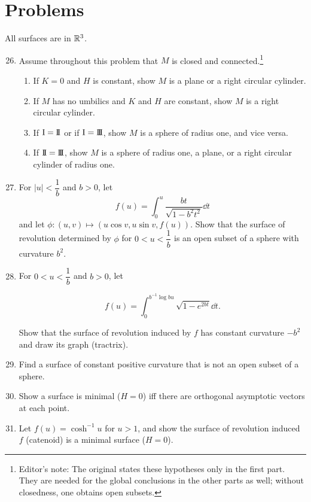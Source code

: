 \documentclass[../main]{subfiles}
\begin{document}
\section*{Problems}
All surfaces are in $\mathbb{R}^3$.
\begin{enumerate}
    \setcounter{enumi}{25}
    \item\label{pro:26} Assume throughout this problem that $M$ is closed and connected.\footnote{Editor's note: The original states these hypotheses only in the first part. They are needed for the global conclusions in the other parts as well; without closedness, one obtains open subsets.}
    \begin{enumerate}[label = (\roman*)]
        \item If $K = 0$ and $H$ is constant, show $M$ is a plane or a right circular cylinder.
        \item If $M$ has no umbilics and $K$ and $H$ are constant, show $M$ is a right circular cylinder.
        \item If $\mathrm{I} = \mathrm{I\!I}$ or if $\mathrm{I} = \mathrm{I\!I\!I}$, show $M$ is a sphere of radius one, and vice versa.
        \item If $\mathrm{I\!I} = \mathrm{I\!I\!I}$, show $M$ is a sphere of radius one, a plane, or a right circular cylinder of radius one.
    \end{enumerate}
      
    
    \item\label{pro:27} For $|u| < \dfrac{1}{b}$ and $b > 0$, let
    \[f(u) = \int_0^u \frac {b t} {\sqrt{1 - b^2 t^2}} \dd t\] 
    and let $\phi : (u, v) \mapsto (u \cos v, u \sin v, f(u))$. Show that the surface of revolution determined by $\phi$ for $0 < u < \dfrac{1}{b}$ is an open subset of a sphere with curvature $b^2$.
    
    \item\label{pro:28} For $0 < u < \dfrac{1}{b}$ and $b > 0$, let 
    
    \[f(u) = \int_0^{b^{-1} \log b u} \sqrt {1 - e^{2 bt}} \dd t.\]
    
    Show that the surface of revolution induced by $f$ has constant curvature $-b^2$ and draw its graph (tractrix). 
    
    \item\label{pro:29} Find a surface of constant positive curvature that is not an open subset of a sphere.
    
    \item\label{pro:30} Show a surface is minimal ($H = 0$) iff there are orthogonal asymptotic vectors at each point.
    
    \item\label{pro:31} Let $f(u) = \cosh^{-1} u$ for $u > 1$, and show the surface of revolution induced $f$ (catenoid) is a minimal surface ($H = 0$).
\end{enumerate}
\end{document}
